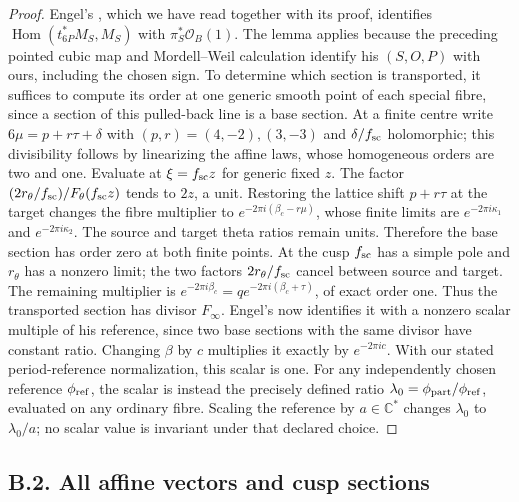 \begin{proof}
Engel's \cite[Lemma 2.1]{E26}, which we have read together with its proof, identifies $\operatorname{Hom}(t_{6P}^*M_S,M_S)$ with $\pi_S^*\mathcal O_B(1)$. The lemma applies because the preceding pointed cubic map and Mordell--Weil calculation identify his $(S,O,P)$ with ours, including the chosen sign. To determine which section is transported, it suffices to compute its order at one generic smooth point of each special fibre, since a section of this pulled-back line is a base section. At a finite centre write $6\mu=p+r\tau+\delta$ with $(p,r)=(4,-2),(3,-3)$ and $\delta/f_{\rm sc}$ holomorphic; this divisibility follows by linearizing the affine laws, whose homogeneous orders are two and one. Evaluate at $\xi=f_{\rm sc}z$ for generic fixed $z$. The factor $(2r_\theta/f_{\rm sc})/F_\theta(f_{\rm sc}z)$ tends to $2z$, a unit. Restoring the lattice shift $p+r\tau$ at the target changes the fibre multiplier to $e^{-2\pi i(\beta_c-r\mu)}$, whose finite limits are $e^{-2\pi i\kappa_1}$ and $e^{-2\pi i\kappa_2}$. The source and target theta ratios remain units. Therefore the base section has order zero at both finite points. At the cusp $f_{\rm sc}$ has a simple pole and $r_\theta$ has a nonzero limit; the two factors $2r_\theta/f_{\rm sc}$ cancel between source and target. The remaining multiplier is
$e^{-2\pi i\beta_c}=q e^{-2\pi i(\beta_c+\tau)}$, of exact order one. Thus the transported section has divisor $F_\infty$. Engel's \cite[Corollary 2.2]{E26} now identifies it with a nonzero scalar multiple of his reference, since two base sections with the same divisor have constant ratio. Changing $\beta$ by $c$ multiplies it exactly by $e^{-2\pi ic}$. With our stated period-reference normalization, this scalar is one. For any independently chosen reference $\phi_{\rm ref}$, the scalar is instead the precisely defined ratio $\lambda_0=\phi_{\rm part}/\phi_{\rm ref}$, evaluated on any ordinary fibre. Scaling the reference by $a\in\mathbb C^*$ changes $\lambda_0$ to $\lambda_0/a$; no scalar value is invariant under that declared choice.
\end{proof}

\subsection{B.2. All affine vectors and cusp sections}

